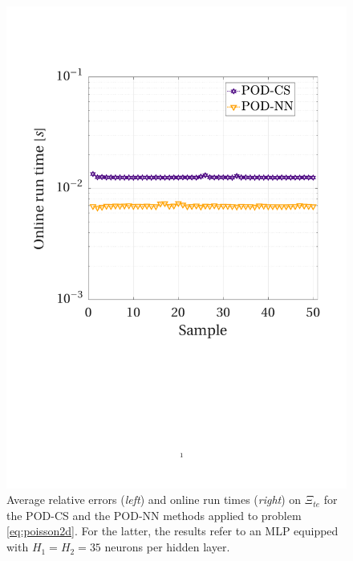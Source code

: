 \documentclass[longtitle]{elsarticle}
\numberwithin{equation}{section}
\theoremstyle{theorem}
\theoremstyle{definition}
\theoremstyle{remark}
\theoremstyle{proposition}
\numberwithin{figure}{section}
\begin{document}
\begin{figure}[b!]
			\includegraphics[scale = 0.372, trim = {1.5cm 8.9cm 1.5cm 3.8cm}, clip]{poisson2d_cs_time}
			
			\vspace*{-0.2cm}
			
			\caption{Average relative errors (\emph{left}) and online run times (\emph{right}) on $\Xi_{te}$ for the POD-CS and the POD-NN methods applied to problem \eqref{eq:poisson2d}. For the latter, the results refer to an MLP equipped with $H_1 = H_2 = 35$ neurons per hidden layer.}
			\label{fig:poisson2d-fig5}
		\end{figure}
\end{document}
